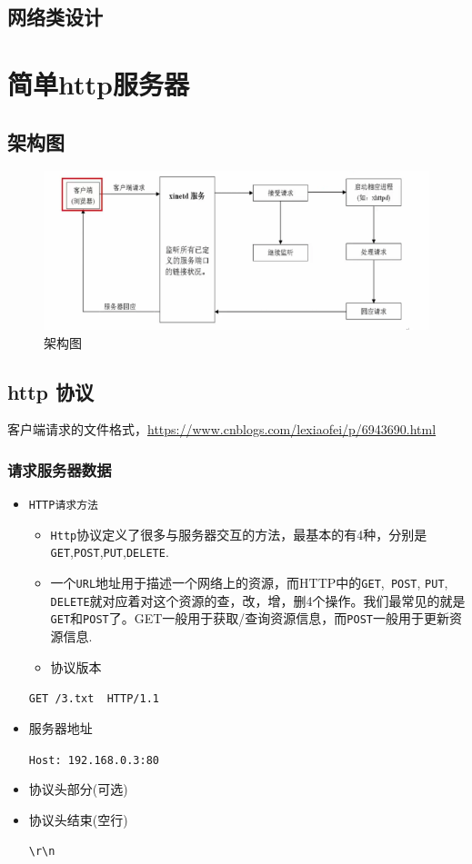\documentclass[UTF8,a4paper,8pt]{ctexbook}
\begin{document}
	\section{网络类设计}
		
\chapter{简单http服务器}
	\section{架构图}
		\begin{figure}[h]
			\centering
			\includegraphics[scale = 0.5]{figure/httpServer.png}
			\caption{架构图}
		\end{figure}
	
	\section{http 协议}
			客户端请求的文件格式，\url{https://www.cnblogs.com/lexiaofei/p/6943690.html}
		\subsection{请求服务器数据}
			\begin{itemize}
				\item \verb|HTTP请求方法| 
					\begin{itemize}
						\item   \verb|Http|协议定义了很多与服务器交互的方法，最基本的有4种，分别是\verb|GET|,\verb|POST|,\verb|PUT|,\verb|DELETE|.
						
						\item 	一个\verb|URL|地址用于描述一个网络上的资源，而HTTP中的\verb|GET|,\verb| POST|, \verb|PUT|, \verb|DELETE|就对应着对这个资源的查，改，增，删4个操作。我们最常见的就是\verb|GET|和\verb|POST|了。GET一般用于获取/查询资源信息，而\verb|POST|一般用于更新资源信息.
						
						\item  协议版本
					\end{itemize}
				
				\verb|GET /3.txt  HTTP/1.1 |
				\item 服务器地址
				
					\verb|Host: 192.168.0.3:80|
				\item 协议头部分(可选)
				\item 协议头结束(空行)
					
					\verb|\r\n|
			\end{itemize}
\end{document}
